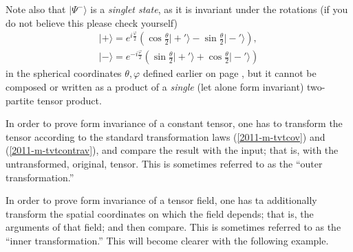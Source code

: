 {Note also that $\vert \Psi^-\rangle$ is a {\em singlet state}, as it is invariant under the rotations (if you do not believe this please check yourself)
\begin{equation}
\begin{array}{l}
\vert + \rangle =
e^{ i{\frac{\varphi}{2}} }
\left(
\cos \frac{\theta}{2} \vert +'  \rangle
-
\sin \frac{\theta}{2} \vert -'   \rangle
\right),
\\
 \vert - \rangle =
e^{ -i{\frac{\varphi}{2}} }
\left(
\sin \frac{\theta}{2} \vert +'   \rangle
+
\cos \frac{\theta}{2} \vert -'  \rangle
\right)
\end{array}
\end{equation}
in the spherical coordinates $\theta , \varphi$ defined earlier on page \pageref{2011-m-spericalcoo},
but it cannot be composed or written as a product of a {\em single} (let alone form invariant) two-partite tensor product.

\eexample
}


%
%

In order to prove form invariance of a constant tensor,
one has to transform the tensor according to the standard transformation laws
(\ref{2011-m-tvtcov}) and (\ref{2011-m-tvtcontrav}), and compare the result with the input;
that is, with the untransformed, original, tensor.
This is sometimes referred to as the ``outer transformation.''


In order to prove form invariance of a tensor field,
one has ta additionally transform the spatial coordinates on which the field depends;
that is, the arguments of that field; and then compare.
This is sometimes referred to as the ``inner transformation.''
This will become clearer with the following example.

